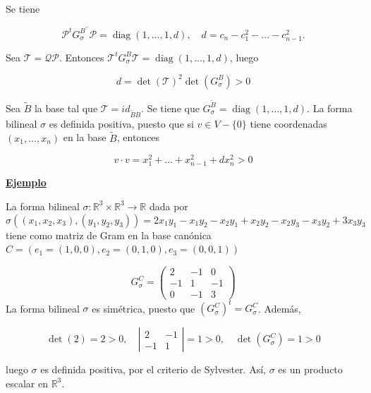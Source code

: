 \documentclass[12pt, a4paper, ones, notitlepage, openany,titlepage]{article}
\newcommand{\ejemplo}{\noindent\underline{\textbf{Ejemplo}}}
\begin{document}
{Se tiene

$$
\mathcal{P}^{t} G_{\sigma}^{B^{\prime \prime}} \mathcal{P}=\operatorname{diag}\left(1,\ldots,1,d\right), \quad d=c_{n}-c_{1}^{2}-\ldots-c_{n-1}^{2} .
$$

Sea $\mathcal{T}=\mathcal{Q} \mathcal{P}$. Entonces $\mathcal{T}^{t} G_{\sigma}^{B} \mathcal{T}=\operatorname{diag}\left(1,\ldots,1,d\right)$, luego

$$
d=\det(\mathcal{T})^{2} \det\left(G_{\sigma}^{B}\right)>0
$$

Sea $\widetilde{B}$ la base tal que $\mathcal{T}=i d_{\tilde{B} B}$. Se tiene que $G_{\sigma}^{\widetilde{B}}=\operatorname{diag}\left(1,\ldots,1,d\right)$. La forma bilineal $\sigma$ es definida positiva, puesto que si $v \in V-\{0\}$ tiene coordenadas $\left(x_{1}, \ldots, x_{n}\right)$ en la base $\tilde{B}$, entonces

$$
v \cdot v=x_{1}^{2}+\ldots+x_{n-1}^{2}+d x_{n}^{2}>0
$$
}
\ejemplo

La forma bilineal $\sigma: \mathbb{R}^{3} \times \mathbb{R}^{3} \rightarrow \mathbb{R}$ dada por
$$
\sigma\left(\left(x_{1}, x_{2}, x_{3}\right),\left(y_{1}, y_{2}, y_{3}\right)\right) = 2 x_{1} y_{1}-x_{1} y_{2}-x_{2} y_{1}+x_{2} y_{2}-x_{2} y_{3}-x_{3} y_{2}+3 x_{3} y_{3}
$$
tiene como matriz de Gram en la base canónica $C=\left(e_{1}=(1,0,0), e_{2}=(0,1,0), e_{3}=(0,0,1)\right)$

$$
G_{\sigma}^{C}=\left(\begin{array}{rrr}
	2 & -1 & 0 \\
	-1 & 1 & -1 \\
	0 & -1 & 3
\end{array}\right)
$$
La forma bilineal $\sigma$ es simétrica, puesto que $\left(G_{\sigma}^{C}\right)^{t}=G_{\sigma}^{C}$. Además,

$$
\det(2)=2>0, \quad\left|\begin{array}{rr}
	2 & -1 \\
	-1 & 1
\end{array}\right|=1>0, \quad \det\left(G_{\sigma}^{C}\right)=1>0
$$

luego $\sigma$ es definida positiva, por el criterio de Sylvester. Así, $\sigma$ es un producto escalar en $\mathbb{R}^{3}$.
\end{document}
